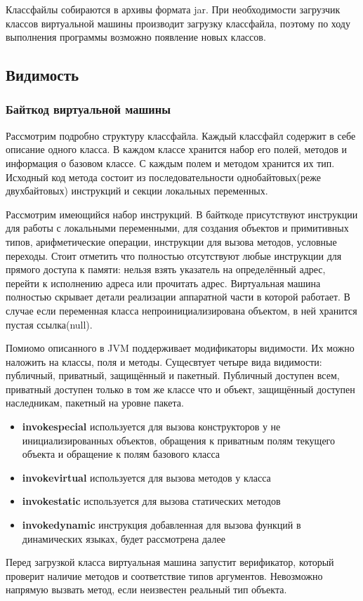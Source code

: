 Классфайлы собираются в архивы формата jar. При необходимости загрузчик классов виртуальной машины производит загрузку классфайла, поэтому по ходу выполнения программы возможно появление новых классов.

\subsection{Видимость}



\subsubsection{Байткод виртуальной машины}
Рассмотрим подробно структуру классфайла. Каждый классфайл содержит в себе описание одного класса. В каждом классе хранится набор его полей, методов и информация о базовом классе. С каждым полем и методом хранится их тип. Исходный код метода состоит из последовательности однобайтовых(реже двухбайтовых) инструкций и секции локальных переменных.

Рассмотрим имеющийся набор инструкций. В байткоде присутствуют инструкции для работы с локальными переменными, для создания объектов и примитивных типов, арифметические операции, инструкции для вызова методов, условные переходы. Стоит отметить что полностью отсутствуют любые инструкции для прямого доступа к памяти: нельзя взять указатель на определённый адрес, перейти к исполнению адреса или прочитать адрес. Виртуальная машина полностью скрывает детали реализации аппаратной части в которой работает. В случае если переменная класса непроинициализирована объектом, в ней хранится пустая ссылка(null).


Помиомо описанного в JVM поддерживает модификаторы видимости. Их можно наложить на классы, поля и методы.  Сущесвтует четыре вида видимости: публичный, приватный, защищённый и пакетный. Публичный доступен всем, приватный доступен только в том же классе что и объект, защищённый доступен наследникам, пакетный на уровне пакета.
\begin{itemize}
    \item \textbf{invokespecial} используется для вызова конструкторов у не инициализированных объектов, обращения к приватным полям текущего объекта и обращение к полям базового класса
    \item \textbf{invokevirtual} используется для вызова методов у класса
    \item \textbf{invokestatic} используется для вызова статических методов
    \item \textbf{invokedynamic} инструкция добавленная для вызова функций в динамических языках, будет рассмотрена далее
\end{itemize}
Перед загрузкой класса виртуальная машина запустит верификатор, который проверит наличие методов и соответствие типов аргументов. Невозможно напрямую вызвать метод, если неизвестен реальный тип объекта.

